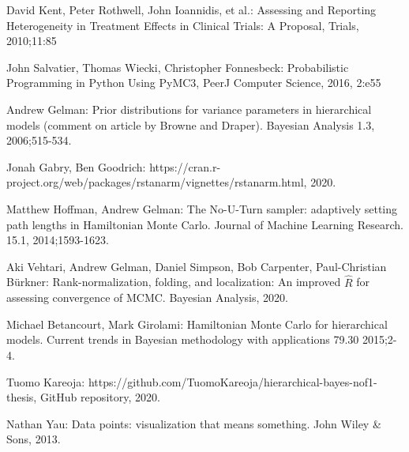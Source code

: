 \documentclass[12pt,a4paper,leqno]{report}
\theoremstyle{plain}
\theoremstyle{definition}
\theoremstyle{remark}
\begin{document}
\begin{thebibliography}{4}
    David Kent, Peter Rothwell, John Ioannidis, et al.: Assessing and Reporting Heterogeneity in
    Treatment Effects in Clinical Trials: A Proposal, Trials, 2010;11:85

    John Salvatier, Thomas Wiecki, Christopher Fonnesbeck: Probabilistic Programming in Python Using PyMC3, PeerJ Computer
    Science, 2016, 2:e55

    Andrew Gelman: Prior distributions for variance parameters in hierarchical models
    (comment on article by Browne and Draper). Bayesian Analysis 1.3, 2006;515-534.

    Jonah Gabry, Ben Goodrich:
    https://cran.r-project.org/web/packages/rstanarm/vignettes/rstanarm.html, 2020.
    
    Matthew Hoffman, Andrew Gelman: The No-U-Turn sampler: adaptively setting path
    lengths in Hamiltonian Monte Carlo. Journal of Machine Learning Research. 15.1,
    2014;1593-1623.
    
    Aki Vehtari, Andrew Gelman, Daniel Simpson, Bob Carpenter, Paul-Christian Bürkner:
    Rank-normalization, folding, and localization: An improved $\widehat {R} $ for
    assessing convergence of MCMC. Bayesian Analysis, 2020.

    Michael Betancourt, Mark Girolami: Hamiltonian Monte Carlo for hierarchical models.
    Current trends in Bayesian methodology with applications 79.30 2015;2-4.

    Tuomo Kareoja: https://github.com/TuomoKareoja/hierarchical-bayes-nof1-thesis,
    GitHub repository, 2020.
    
    Nathan Yau: Data points: visualization that means something.
    John Wiley \& Sons, 2013.

\end{thebibliography}
\end{document}
